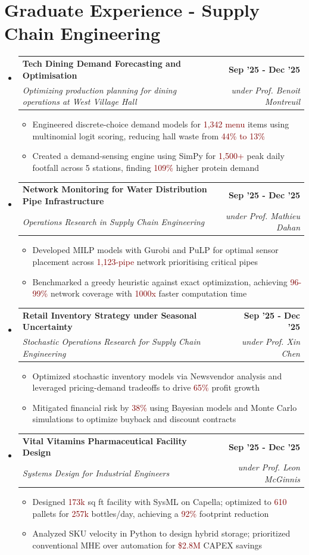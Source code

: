 \documentclass[letterpaper,10pt]{article}
\makeatletter
\newcommand{\resumeItem}[1]{
  \item\small{
    {#1 \vspace{0pt}}
  }
}
\newcommand{\resumeSubheading}[4]{
  \vspace{-1pt}\item
    \begin{tabular*}{1.0\textwidth}[t]{l@{\extracolsep{\fill}}r}
      \textbf{#1} & \textbf{\small #2} \\
      \textit{\small#3} & \textit{\small #4} \\
    \end{tabular*}\vspace{-4pt}
}
\newcommand{\resumeSubHeadingListStart}{\begin{itemize}[leftmargin=0.0in, label={}]}
\newcommand{\resumeSubHeadingListEnd}{\end{itemize}}
\newcommand{\resumeItemListStart}{\begin{itemize}[leftmargin=0.15in]}
\newcommand{\resumeItemListEnd}{\end{itemize}\vspace{-6pt}}
\makeatother
\begin{document}
\section{\Large{Graduate Experience - Supply Chain Engineering}}
    \resumeSubHeadingListStart
    \resumeSubheading
    {Tech Dining Demand Forecasting and Optimisation}{Sep '25 - Dec '25}
    {Optimizing production planning for dining operations at West Village Hall}{under Prof. Benoit Montreuil}
    \resumeItemListStart
        \resumeItem{Engineered discrete-choice demand models for \textcolor{maroon}{1,342 menu} items using multinomial logit scoring, reducing hall waste from \textcolor{maroon}{44\% to 13\%}}
        \resumeItem{Created a demand-sensing engine using SimPy for \textcolor{maroon}{1,500+} peak daily footfall across 5 stations, finding \textcolor{maroon}{109\%} higher protein demand}
    \resumeItemListEnd

    \resumeSubheading
    {Network Monitoring for Water Distribution Pipe Infrastructure}{Sep '25 - Dec '25}
    {Operations Research in Supply Chain Engineering}{under Prof. Mathieu Dahan}
    \resumeItemListStart
        \resumeItem{Developed MILP models with Gurobi and PuLP for optimal sensor placement across \textcolor{maroon}{1,123-pipe} network prioritising critical pipes}
        \resumeItem{Benchmarked a greedy heuristic against exact optimization, achieving \textcolor{maroon}{96-99\%} network coverage with \textcolor{maroon}{1000x} faster computation time}
    \resumeItemListEnd

    \resumeSubheading
    {Retail Inventory Strategy under Seasonal Uncertainty}{Sep '25 - Dec '25}
    {Stochastic Operations Research for Supply Chain Engineering}{under Prof. Xin Chen}
    \resumeItemListStart
        \resumeItem{Optimized stochastic inventory models via Newsvendor analysis and leveraged pricing-demand tradeoffs to drive \textcolor{maroon}{65\%} profit growth}
        \resumeItem{Mitigated financial risk by \textcolor{maroon}{38\%} using Bayesian models and Monte Carlo simulations to optimize buyback and discount contracts}
    \resumeItemListEnd

    \resumeSubheading
    {Vital Vitamins Pharmaceutical Facility Design}{Sep '25 - Dec '25}
    {Systems Design for Industrial Engineers}{under Prof. Leon McGinnis}
    \resumeItemListStart
        \resumeItem{Designed \textcolor{maroon}{173k} sq ft facility with SysML on Capella; optimized to \textcolor{maroon}{610} pallets for \textcolor{maroon}{257k} bottles/day, achieving a \textcolor{maroon}{92\%} footprint reduction}
        \resumeItem{Analyzed SKU velocity in Python to design hybrid storage; prioritized conventional MHE over automation for \textcolor{maroon}{\$2.8M} CAPEX savings}
    \resumeItemListEnd
    \resumeSubHeadingListEnd
\vspace{-10pt}
\end{document}
